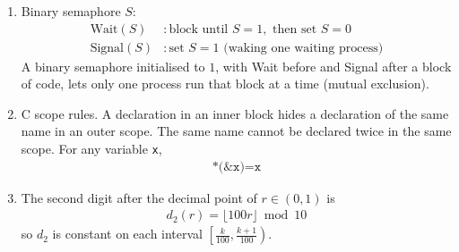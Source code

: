 \begin{enumerate}[label=\thesubsection.\arabic*, ref=\thesubsection.\theenumi]
\item Binary semaphore $S$:
\begin{align}
\text{Wait}(S) &: \text{block until } S = 1, \text{ then set } S = 0
\label{eq:sem-wait} \\
\text{Signal}(S) &: \text{set } S = 1 \text{ (waking one waiting process)}
\label{eq:sem-signal}
\end{align}
A binary semaphore initialised to $1$, with Wait before and Signal after a
block of code, lets only one process run that block at a time (mutual
exclusion).

\item C scope rules. A declaration in an inner block hides a declaration
of the same name in an outer scope. The same name cannot be declared twice
in the same scope. For any variable \texttt{x},
\begin{align}
\texttt{*(\&x)} = \texttt{x}
\label{eq:deref}
\end{align}
\label{fm:c-scope}

\item The second digit after the decimal point of $r \in (0, 1)$ is
\begin{align}
d_2(r) = \lfloor 100 r \rfloor \bmod 10
\label{eq:digit2}
\end{align}
so $d_2$ is constant on each interval
$\left[\frac{k}{100}, \frac{k+1}{100}\right)$.

\end{enumerate}
